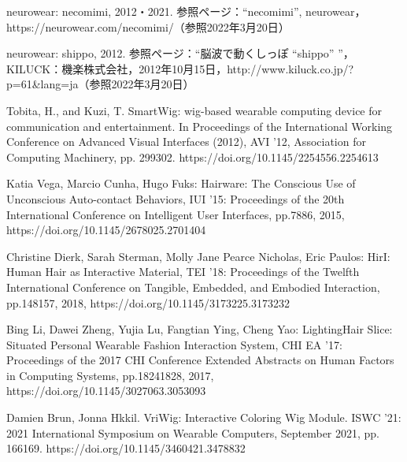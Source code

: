 \documentclass[a4paper]{jsarticle}
\begin{document}
\begin{thebibliography}{999}

 neurowear: necomimi, 2012・2021. 参照ページ：“necomimi”, neurowear，https://neurowear.com/necomimi/（参照2022年3月20日）

neurowear: shippo, 2012. 参照ページ：“脳波で動くしっぽ “shippo” ”，KILUCK：機楽株式会社，2012年10月15日，http://www.kiluck.co.jp/?p=61\&lang=ja（参照2022年3月20日）
  
Tobita, H., and Kuzi, T. SmartWig: wig-based wearable computing device for communication and entertainment. In Proceedings of the International Working Conference on Advanced Visual Interfaces (2012), AVI ’12, Association for Computing Machinery, pp. 299302. https://doi.org/10.1145/2254556.2254613

Katia Vega, Marcio Cunha, Hugo Fuks: Hairware: The Conscious Use of Unconscious Auto-contact Behaviors, IUI '15: Proceedings of the 20th International Conference on Intelligent User Interfaces, pp.7886, 2015, https://doi.org/10.1145/2678025.2701404

Christine Dierk, Sarah Sterman, Molly Jane Pearce Nicholas, Eric Paulos: HirI: Human Hair as Interactive Material, TEI '18: Proceedings of the Twelfth International Conference on Tangible, Embedded, and Embodied Interaction, pp.148157, 2018, https://doi.org/10.1145/3173225.3173232

Bing Li, Dawei Zheng, Yujia Lu, Fangtian Ying, Cheng Yao: LightingHair Slice: Situated Personal Wearable Fashion Interaction System, CHI EA '17: Proceedings of the 2017 CHI Conference Extended Abstracts on Human Factors in Computing Systems, pp.18241828, 2017, https://doi.org/10.1145/3027063.3053093

Damien Brun,  Jonna Hkkil. VriWig: Interactive Coloring Wig Module. ISWC '21: 2021 International Symposium on Wearable Computers, September 2021,  pp. 166169. https://doi.org/10.1145/3460421.3478832

\end{thebibliography}
\end{document}
